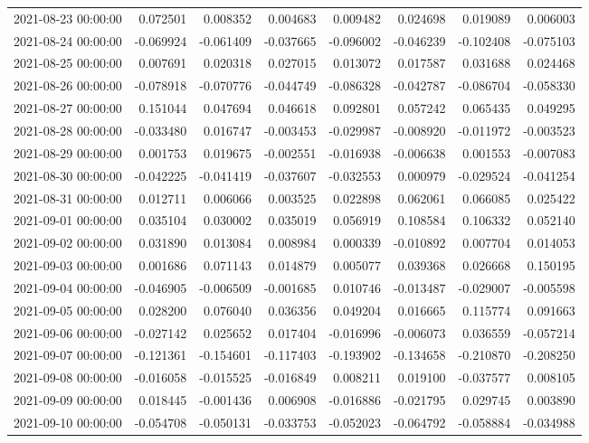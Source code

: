 \begin{tabular}{lrrrrrrr}
2021-08-23 00:00:00 & 0.072501 & 0.008352 & 0.004683 & 0.009482 & 0.024698 & 0.019089 & 0.006003 \\
2021-08-24 00:00:00 & -0.069924 & -0.061409 & -0.037665 & -0.096002 & -0.046239 & -0.102408 & -0.075103 \\
2021-08-25 00:00:00 & 0.007691 & 0.020318 & 0.027015 & 0.013072 & 0.017587 & 0.031688 & 0.024468 \\
2021-08-26 00:00:00 & -0.078918 & -0.070776 & -0.044749 & -0.086328 & -0.042787 & -0.086704 & -0.058330 \\
2021-08-27 00:00:00 & 0.151044 & 0.047694 & 0.046618 & 0.092801 & 0.057242 & 0.065435 & 0.049295 \\
2021-08-28 00:00:00 & -0.033480 & 0.016747 & -0.003453 & -0.029987 & -0.008920 & -0.011972 & -0.003523 \\
2021-08-29 00:00:00 & 0.001753 & 0.019675 & -0.002551 & -0.016938 & -0.006638 & 0.001553 & -0.007083 \\
2021-08-30 00:00:00 & -0.042225 & -0.041419 & -0.037607 & -0.032553 & 0.000979 & -0.029524 & -0.041254 \\
2021-08-31 00:00:00 & 0.012711 & 0.006066 & 0.003525 & 0.022898 & 0.062061 & 0.066085 & 0.025422 \\
2021-09-01 00:00:00 & 0.035104 & 0.030002 & 0.035019 & 0.056919 & 0.108584 & 0.106332 & 0.052140 \\
2021-09-02 00:00:00 & 0.031890 & 0.013084 & 0.008984 & 0.000339 & -0.010892 & 0.007704 & 0.014053 \\
2021-09-03 00:00:00 & 0.001686 & 0.071143 & 0.014879 & 0.005077 & 0.039368 & 0.026668 & 0.150195 \\
2021-09-04 00:00:00 & -0.046905 & -0.006509 & -0.001685 & 0.010746 & -0.013487 & -0.029007 & -0.005598 \\
2021-09-05 00:00:00 & 0.028200 & 0.076040 & 0.036356 & 0.049204 & 0.016665 & 0.115774 & 0.091663 \\
2021-09-06 00:00:00 & -0.027142 & 0.025652 & 0.017404 & -0.016996 & -0.006073 & 0.036559 & -0.057214 \\
2021-09-07 00:00:00 & -0.121361 & -0.154601 & -0.117403 & -0.193902 & -0.134658 & -0.210870 & -0.208250 \\
2021-09-08 00:00:00 & -0.016058 & -0.015525 & -0.016849 & 0.008211 & 0.019100 & -0.037577 & 0.008105 \\
2021-09-09 00:00:00 & 0.018445 & -0.001436 & 0.006908 & -0.016886 & -0.021795 & 0.029745 & 0.003890 \\
2021-09-10 00:00:00 & -0.054708 & -0.050131 & -0.033753 & -0.052023 & -0.064792 & -0.058884 & -0.034988 \\

\end{tabular}
